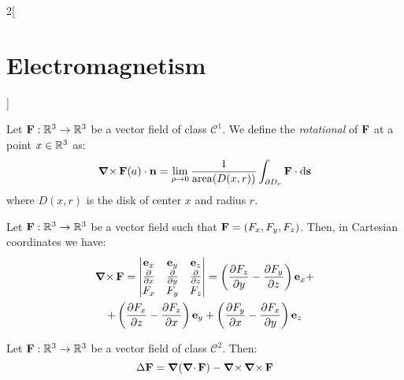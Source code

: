 \documentclass[../../../main_physics.tex]{subfiles}
\begin{document}
\begin{multicols}{2}[\section{Electromagnetism}]
  \begin{definition}[Rotational]
    Let $\boldsymbol{\mathrm{F}}:\mathbb{R}^3\rightarrow\mathbb{R}^3$ be a vector field of class $\mathcal{C}^1$. We define the \emph{rotational} of $\boldsymbol{\mathrm{F}}$ at a point $x\in\mathbb{R}^3$ as:
    $$\operatorname{\boldsymbol{\mathrm{\nabla}}\times}\boldsymbol{\mathrm{F}}(a)\cdot\boldsymbol{\mathrm{n}}=\lim_{\rho\to 0}\frac{1}{\operatorname{area}(D(x,r))}\int_{\partial D_r}\boldsymbol{\mathrm{F}}\cdot \dd{\boldsymbol{\mathrm{s}}}$$
    where $D(x,r)$ is the disk of center $x$ and radius $r$.
  \end{definition}
  \begin{proposition}
    Let $\boldsymbol{\mathrm{F}}:\mathbb{R}^3\rightarrow\mathbb{R}^3$ be a vector field such that $\boldsymbol{\mathrm{F}}=(F_x,F_y,F_z)$. Then, in Cartesian coordinates we have:
    \begin{multline*}
      \operatorname{\boldsymbol{\mathrm{\nabla}}\times} \boldsymbol{\mathrm{F}}=
      \begin{vmatrix}
        \boldsymbol{\mathrm{e}}_x  & \boldsymbol{\mathrm{e}}_y  & \boldsymbol{\mathrm{e}}_z  \\
        \pdv{}{x} & \pdv{}{y} & \pdv{}{z} \\
        F_x       & F_y       & F_z       \\
      \end{vmatrix} = \left(\frac{\partial F_z}{\partial y}-\frac{\partial F_y}{\partial z}\right)\boldsymbol{\mathrm{e}}_x+\\+\left(\frac{\partial F_x}{\partial z}-\frac{\partial F_z}{\partial x}\right)\boldsymbol{\mathrm{e}}_y+\left(\frac{\partial F_y}{\partial x}-\frac{\partial F_x}{\partial y}\right)\boldsymbol{\mathrm{e}}_z
    \end{multline*}
  \end{proposition}
  \begin{proposition}
    Let $\boldsymbol{\mathrm{F}}:\mathbb{R}^3\rightarrow\mathbb{R}^3$ be a vector field of class $\mathcal{C}^2$. Then: $$\Delta\boldsymbol{\mathrm{F}}=\grad(\operatorname{\boldsymbol{\mathrm{\nabla}}\cdot}\boldsymbol{\mathrm{F}})-\operatorname{\boldsymbol{\mathrm{\nabla}}\times}\operatorname{\boldsymbol{\mathrm{\nabla}}\times}\boldsymbol{\mathrm{F}}$$
  \end{proposition}

\end{multicols}
\end{document}
